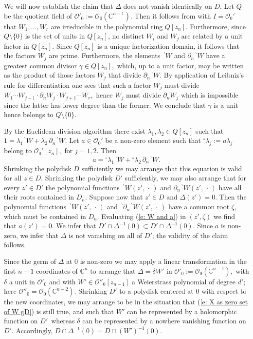 \documentclass[12pt,a4paper]{article}
\def\msy#1{{\mathbb #1}}
\def\C{{\msy C}}
\def\gd{\delta}
\def\gg{\gamma}
\def\gl{\lambda}
\def\gz{\zeta}
\def\gD{\Delta}
\def\cO{{\mathcal O}}
\numberwithin{Thm}{section}
\numberwithin{equation}{section}
\def\dotvar{\, \cdot\,}
\numberwithin{equation}{section}
\def\bp{\!{\,}^\backprime}
\begin{document}
We will now establish the claim that $\gD$ does not vanish identically on $D.$
Let $Q$ be the quotient field of $\cO'_0 := \cO_0(\C^{n-1}).$ Then
it follows from \cite[Cor.~3.2 (2)]{FGhol} with $I = \cO_0'$ that $W_1,\ldots , W_r$ are irreducible in 
  the polynomial ring $Q[z_n].$ Furthermore, since $Q\setminus\{0\}$ is the set of 
units in $Q[z_n]$, no distinct $W_i$ and $W_j$ are related by a unit factor in $Q[z_n].$ 
Since $Q[z_n]$ is a unique factorization domain, it follows that the factors $W_j$ are prime.
Furthermore, the elements $\bp W$ and $\partial_n \bp W$ have a greatest common divisor $\gg \in Q[z_n],$
which, up to a unit factor, may be written as the product of those factors $W_j$ that 
divide $\partial_n \bp W.$ By application of Leibniz's rule for differentiation one sees that 
such a factor $W_j$ must divide $W_1 \cdots W_{j-1} \cdot \partial_n W_j \cdot W_{j+1} \cdots W_r,$ 
hence $W_j$ must divide $\partial_n W_j$ which is impossible since the latter has lower degree
than the former. We conclude that $\gg$ is a unit hence belongs to $Q\setminus\{0\}.$ 

By the Euclidean division algorithm
there exist $\gl_1, \gl_2 \in Q[z_n]$ such that
$ 
1 = \gl_1\bp W + \gl_2 \,\partial_n \bp W.
$ 
Let $a \in \cO_0'$ be a non-zero element such that ${}^\circ \!\gl_j:= a \gl_j$ belong to
$\cO_0'[z_n],$  for $j =1,2.$ Then
\begin{equation}
\label{e: W and a}
a = {}^\circ\! \gl_1 \bp W + {}^\circ\! \gl_2 \,\partial_n \bp W.
\end{equation}
Shrinking the polydisk $D$ sufficiently we may arrange that this equation is valid 
for all $z \in D.$ Shrinking the polydisk $D'$ sufficiently, we may also arrange that for every $z' \in D'$ the polynomial functions $\bp W(z', \dotvar)$ and $\partial_n \bp W(z', \dotvar)$ 
have all their roots contained in $D_n.$ 
Suppose now that $z' \in D$ and $\gD(z') = 0.$ 
Then the polynomial functions $\bp W(z', \dotvar)$ and 
$\bp \partial_n \bp W(z' , \dotvar)$ have a common root $\gz$, which must be contained in $D_n.$
Evaluating (\ref{e: W and a}) in $(z', \gz)$ we find that $a(z') = 0.$ We infer that $D' \cap \gD^{-1}(0)
\subset D' \cap \gD^{-1}(0).$ Since $a$ is non-zero, we infer
that $\gD$ is not vanishing on all of $D'$; the validity of the claim follows.
  
Since the germ of $\gD$ at $0$ is non-zero we may apply 
a linear transformation in the first $n-1$ coordinates of $\C^n$ to
 arrange that $\gD = \gd W'$ in $\cO'_0 := \cO_0(\C^{n-1}),$ with $\gd$ a unit in $\cO'_0$ and with $W' \in \cO''_0[z_{n-1}]$ a Weierstrass polynomial of degree $d'$; here $\cO''_0 =\cO_0(\C^{n-2}).$ Shrinking $D'$ to a polydisk centered at $0$ with 
respect to the new coordinates, we may arrange to be in the situation that 
(\ref{e: X as zero set of W gD}) is still true,
and such that $W'$ can be represented by a holomorphic function on $D'\,$ whereas
$\gd$ can be represented by a nowhere vanishing function on $D'.$ Accordingly,
$D \cap \gD^{-1}(0) = D \cap (W')^{-1}(0).$ 
\end{document}
